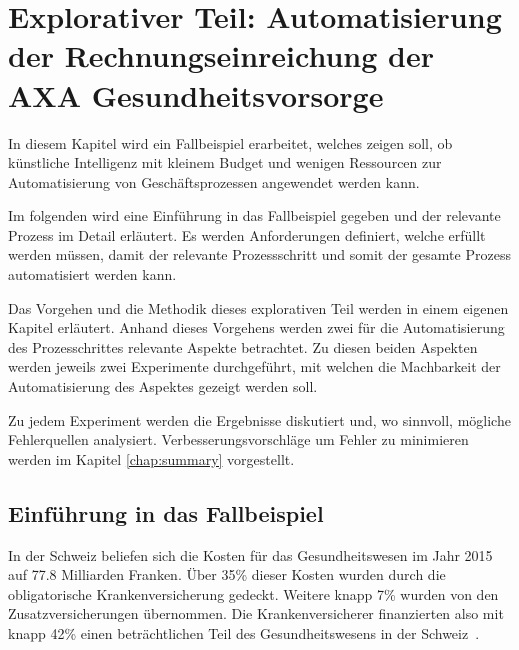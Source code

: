 \section{Explorativer Teil: Automatisierung der Rechnungseinreichung der AXA Gesundheitsvorsorge}
\label{chap:experiment}

In diesem Kapitel wird ein Fallbeispiel erarbeitet, welches zeigen soll, ob künstliche Intelligenz mit kleinem Budget und wenigen Ressourcen zur Automatisierung von Geschäftsprozessen angewendet werden kann. 

Im folgenden wird eine Einführung in das Fallbeispiel gegeben und der relevante Prozess im Detail erläutert. Es werden Anforderungen definiert, welche erfüllt werden müssen, damit der relevante Prozessschritt und somit der gesamte Prozess automatisiert werden kann.

Das Vorgehen und die Methodik dieses explorativen Teil werden in einem eigenen Kapitel erläutert. Anhand dieses Vorgehens werden zwei für die Automatisierung des Prozesschrittes relevante Aspekte betrachtet. Zu diesen beiden Aspekten werden jeweils zwei Experimente durchgeführt, mit welchen die Machbarkeit der Automatisierung des Aspektes gezeigt werden soll.

Zu jedem Experiment werden die Ergebnisse diskutiert und, wo sinnvoll, mögliche Fehlerquellen analysiert. Verbesserungsvorschläge um Fehler zu minimieren werden im Kapitel \ref{chap:summary} vorgestellt.




\subsection{Einführung in das Fallbeispiel}
In der Schweiz beliefen sich die Kosten für das Gesundheitswesen im Jahr 2015 auf 77.8 Milliarden Franken. Über 35\% dieser Kosten wurden durch die obligatorische Krankenversicherung gedeckt. Weitere knapp 7\% wurden von den Zusatzversicherungen übernommen. Die Krankenversicherer finanzierten also mit knapp 42\% einen beträchtlichen Teil des Gesundheitswesens in der Schweiz~\autocite{BfS2018}.

